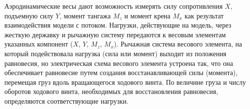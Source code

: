 \documentclass[specialist, subf, href, colorlinks=true, 14pt, final]{disser}
\theoremstyle{definition}
\begin{document}
Аэродинамические весы дают возможность измерять силу сопротивления $X$, подъемную силу $Y$, момент тангажа $M_z$ и момент крена $M_x$ как результат взаимодействия модели с потоком. Нагрузки, действующие на модель, через жесткую державку и рычажную систему передаются к весовым элементам указанных компонент ($X$, $Y$, $M_z$, $M_x$). Рычажная система весового элемента, на который подействовала нагрузка (сила или момент) выходит из положения равновесия, но электрическая схема весового элемента устроена так, что она обеспечивает равновесие путем создания восстанавливающей силы (момента), перемещая груз вдоль вращающегося ходового винта. По величине груза и числу оборотов ходового винта, необходимых для восстановления равновесия, определяются соответствующие нагрузки.
\begin{figure}[!htp]
  \caption{}
  \label{2-5-5}
\end{figure}
\end{document}
